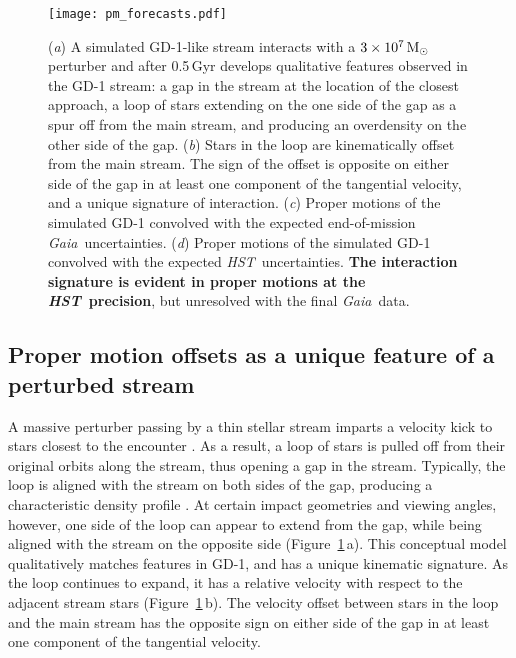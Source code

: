 \documentclass[12pt]{article}
\newcommand{\hst}{\textsl{HST}}
\newcommand{\gaia}{\textsl{Gaia}}
\begin{document}
\begin{figure}
\begin{center}
\texttt{[image: pm\_forecasts.pdf]}
\end{center}
\caption{
(\emph{a}) A simulated GD-1-like stream interacts with a $3\times10^7\,\rm M_\odot$ perturber and after 0.5\,Gyr develops qualitative features observed in the GD-1 stream: a gap in the stream at the location of the closest approach, a loop of stars extending on the one side of the gap as a spur off from the main stream, and producing an overdensity on the other side of the gap.
(\emph{b}) Stars in the loop are kinematically offset from the main stream.
The sign of the offset is opposite on either side of the gap in at least one component of the tangential velocity, and a unique signature of interaction.
(\emph{c}) Proper motions of the simulated GD-1 convolved with the expected end-of-mission \gaia\ uncertainties.
(\emph{d}) Proper motions of the simulated GD-1 convolved with the expected \hst\ uncertainties.
{\bf The interaction signature is evident in proper motions at the \hst\ precision}, but unresolved with the final \gaia\ data.
}
\label{fig:fiducial}
\end{figure}

\subsection*{Proper motion offsets as a unique feature of a perturbed stream}
A massive perturber passing by a thin stellar stream imparts a velocity kick to stars closest to the encounter \parencite[e.g.,][]{erkal2015}.
As a result, a loop of stars is pulled off from their original orbits along the stream, thus opening a gap in the stream.
Typically, the loop is aligned with the stream on both sides of the gap, producing a characteristic density profile \parencite[e.g.,][]{carlberg2013}.
At certain impact geometries and viewing angles, however, one side of the loop can appear to extend from the gap, while being aligned with the stream on the opposite side (Figure~\ref{fig:fiducial}\,a).
This conceptual model qualitatively matches features in GD-1, and has a unique kinematic signature.
As the loop continues to expand, it has a relative velocity with respect to the adjacent stream stars (Figure~\ref{fig:fiducial}\,b).
The velocity offset between stars in the loop and the main stream has the opposite sign on either side of the gap in at least one component of the tangential velocity.
\end{document}
